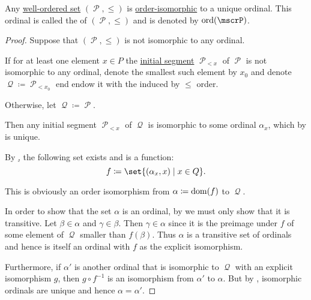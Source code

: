 \begin{proposition}\label{thm:order_type_existence}\cite[thm. 63.25]{OpenLogicFull}
  Any \hyperref[def:well_ordered_set]{well-ordered set} \( (\mscrP, \leq) \) is \hyperref[def:poset/homomorphism]{order-isomorphic} to a unique ordinal. This ordinal is called the  of \( (\mscrP, \leq) \) and is denoted by \( \ord(\mscrP) \).
\end{proposition}
\begin{proof}
  Suppose that \( (\mscrP, \leq) \) is not isomorphic to any ordinal.

  If for at least one element \( x \in P \) the \hyperref[def:poset_interval/ray]{initial segment} \( \mscrP_{<x} \) of \( \mscrP \) is not isomorphic to any ordinal, denote the smallest such element by \( x_0 \) and denote \( \mscrQ \coloneqq \mscrP_{<x_0} \) end endow it with the induced by \( \leq \) order.

  Otherwise, let \( \mscrQ \coloneqq \mscrP \).

  Then any initial segment \( \mscrP_{<x} \) of \( \mscrQ \) is isomorphic to some ordinal \( \alpha_x \), which by  is unique.

  By \hyperref[def:zfc/A8], the following set exists and is a function:
  \begin{equation*}
    f \coloneqq \set{ (\alpha_x, x) \given x \in Q }.
  \end{equation*}

  This is obviously an order isomorphism from \( \alpha \coloneqq \operatorname{dom}(f) \) to \( \mscrQ \).

  In order to show that the set \( \alpha \) is an ordinal, by  we must only show that it is transitive. Let \( \beta \in \alpha \) and \( \gamma \in \beta \). Then \( \gamma \in \alpha \) since it is the preimage under \( f \) of some element of \( \mscrQ \) smaller than \( f(\beta) \). Thus \( \alpha \) is a transitive set of ordinals and hence is itself an ordinal with \( f \) as the explicit isomorphism.

  Furthermore, if \( \alpha' \) is another ordinal that is isomorphic to \( \mscrQ \) with an explicit isomorphism \( g \), then \( g \circ f^{-1} \) is an isomorphism from \( \alpha' \) to \( \alpha \). But by , isomorphic ordinals are unique and hence \( \alpha = \alpha' \).
\end{proof}
